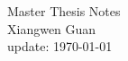 \documentclass[a4paper]{article}
\begin{document}
\begin{center}
    \huge{Master Thesis Notes}\\[0.4em]
    \Large{Xiangwen Guan}\\[0.2em]
    update: \today 
\end{center}

\tableofcontents

\end{document}
